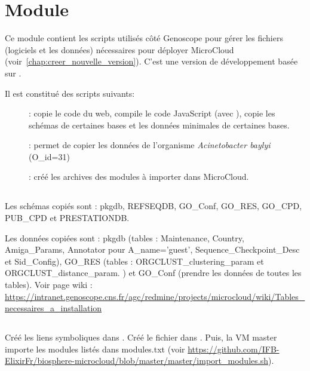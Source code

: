 \chapter{Module \micWEBdeployVer}

Ce module contient les scripts utilisés côté Genoscope pour gérer les fichiers (logiciels et les données) nécessaires pour déployer MicroCloud (voir~\autoref{chap:creer_nouvelle_version}).
C'est une version de développement basée sur .

Il est constitué des scripts suivants:
\begin{description}
	\item[]: copie le code du web, compile le code JavaScript (avec ), copie les schémas de certaines bases et les données minimales de certaines bases.
	\item[]: permet de copier les données de l'organisme \textit{Acinetobacter baylyi} (O\_id=31)
	\item[]: créé les archives des modules à importer dans MicroCloud.
\end{description}

\section{}

Les schémas copiés sont : pkgdb, REFSEQDB, GO\_Conf, GO\_RES, GO\_CPD, PUB\_CPD et PRESTATIONDB.
\newline

Les données copiées sont : pkgdb (tables : Maintenance, Country, Amiga\_Params,
Annotator pour A\_name='guest', Sequence\_Checkpoint\_Desc et Sid\_Config), GO\_RES (tables : ORGCLUST\_clustering\_param et ORGCLUST\_distance\_param.
) et GO\_Conf (prendre les données de toutes les tables). Voir page wiki : \url{https://intranet.genoscope.cns.fr/agc/redmine/projects/microcloud/wiki/Tables_necessaires_a_installation}


\section{}

Créé les liens symboliques dans .
Créé le fichier  dans .
\newline
Puis, la VM master importe les modules listés dans modules.txt (voir \url{https://github.com/IFB-ElixirFr/biosphere-microcloud/blob/master/master/import_modules.sh}).


